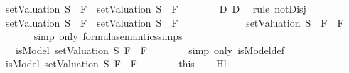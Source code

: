 \begin{isabellebody}
\ {\isachardoublequoteopen}{\isasymnot}\ {\isacharparenleft}{\isacharparenleft}setValuation\ S{\isacharparenright}\ {\isasymTurnstile}\ F{}\ {\isasymor}\ {\isacharparenleft}setValuation\ S{\isacharparenright}\ {\isasymTurnstile}\ F{}{\isacharparenright}{\isachardoublequoteclose}\isanewline
\ \ \ \ \ \ \isamarkupfalse%
\ D{}\ D{}\ \isamarkupfalse%
\ {\isacharparenleft}rule\ notDisj{\isacharparenright}\isanewline
\ \ \ \ \isamarkupfalse%
\ \isamarkupfalse%
\ {\isachardoublequoteopen}{\isacharparenleft}{\isasymnot}\ {\isacharparenleft}{\isacharparenleft}setValuation\ S{\isacharparenright}\ {\isasymTurnstile}\ F{}\ {\isasymor}\ {\isacharparenleft}setValuation\ S{\isacharparenright}\ {\isasymTurnstile}\ F{}{\isacharparenright}{\isacharparenright}\ {\isacharequal}\ \isanewline
\ \ \ \ \ \ \ \ \ \ {\isacharparenleft}{\isasymnot}\ {\isacharparenleft}setValuation\ S{\isacharparenright}\ {\isasymTurnstile}\ {\isacharparenleft}F{}\ \isactrlbold {\isasymor}\ F{}{\isacharparenright}{\isacharparenright}{\isachardoublequoteclose}\isanewline
\ \ \ \ \ \ \isamarkupfalse%
\ {\isacharparenleft}simp\ only{\isacharcolon}\ formula{\isacharunderscore}semantics{\isachardot}simps{\isacharparenleft}{}{\isacharparenright}{\isacharparenright}\isanewline
\ \ \ \ \isamarkupfalse%
\ \isamarkupfalse%
\ {\isachardoublequoteopen}{\isasymdots}\ {\isacharequal}\ {\isacharparenleft}{\isasymnot}\ isModel\ {\isacharparenleft}setValuation\ S{\isacharparenright}\ {\isacharparenleft}F{}\ \isactrlbold {\isasymor}\ F{}{\isacharparenright}{\isacharparenright}{\isachardoublequoteclose}\isanewline
\ \ \ \ \ \ \isamarkupfalse%
\ {\isacharparenleft}simp\ only{\isacharcolon}\ isModel{\isacharunderscore}def{\isacharparenright}\isanewline
\ \ \ \ \isamarkupfalse%
\ \isamarkupfalse%
\ {\isachardoublequoteopen}{\isasymnot}\ isModel\ {\isacharparenleft}setValuation\ S{\isacharparenright}\ {\isacharparenleft}F{}\ \isactrlbold {\isasymor}\ F{}{\isacharparenright}{\isachardoublequoteclose}\isanewline
\ \ \ \ \ \ \isamarkupfalse%
\ this\isanewline
\ \ \isamarkupfalse%
\isanewline
{}\isamarkupfalse%
%
\endisatagproof
{\isafoldproof}%
%
\isadelimproof
\isanewline
%
\endisadelimproof
\isanewline
\isanewline
{}\isamarkupfalse%
\ Hl{}{\isacharunderscore}{}{\isacharcolon}\isanewline

\end{isabellebody}
